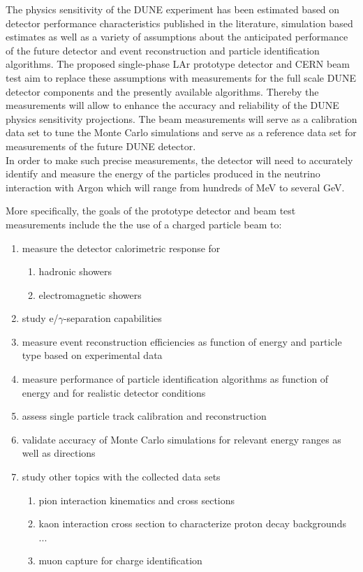 The physics sensitivity of the DUNE experiment has been estimated based on detector performance characteristics published in the literature, simulation based estimates as well as a variety of assumptions about the anticipated performance of the future detector and event reconstruction and particle identification algorithms.
The proposed single-phase LAr prototype detector and CERN beam test aim to replace these assumptions with measurements for the full scale DUNE detector components and the presently available algorithms. Thereby the measurements will allow to enhance the accuracy and reliability of the DUNE physics sensitivity projections. 
The beam measurements will serve as a calibration data set to tune the Monte Carlo simulations and serve as a reference data set for measurements of the future DUNE detector. \\
%

In order to make such precise measurements, the detector will need to accurately identify and measure the energy of the particles produced in the neutrino interaction with Argon which will range from hundreds of MeV to several GeV.



More specifically, the goals of the prototype detector and beam test measurements include the
the use of a charged particle beam to:
\begin{enumerate}
\item measure the detector calorimetric response for
\begin{enumerate}
	\item hadronic showers
	\item electromagnetic showers
\end{enumerate}
\item study e/$\gamma$-separation capabilities
\item measure event reconstruction efficiencies as function of energy and particle type based on experimental data
\item measure performance of particle identification algorithms as function of energy and for realistic detector conditions
\item assess single particle track calibration and reconstruction
\item validate accuracy of Monte Carlo simulations for relevant energy ranges as well as directions

\item study other topics with the collected data sets
 \begin{enumerate}
    \item pion interaction kinematics and cross sections
    \item kaon interaction cross section to characterize proton decay backgrounds ...
    \item muon capture for charge identification
 \end{enumerate}
\end{enumerate}

